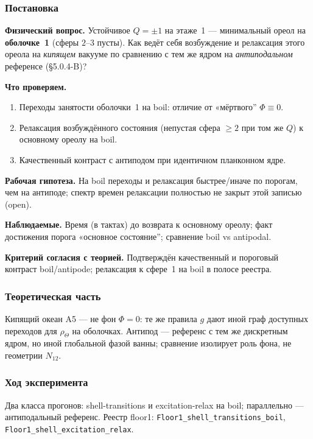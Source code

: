 \label{exp:cef03}

\subsubsection*{Постановка}
\textbf{Физический вопрос.}
Устойчивое $Q=\pm1$ на этаже~1 --- минимальный ореол на \textbf{оболочке~1} (сферы $2$--$3$ пусты).
Как ведёт себя возбуждение и релаксация этого ореола на \emph{кипящем} вакууме по сравнению с тем же ядром на \emph{антиподальном} референсе (§5.0.4-B)?

\textbf{Что проверяем.}
\begin{enumerate}[label=\textbf{(\alph*)},leftmargin=*,itemsep=0.25em]
\item Переходы занятости оболочки~1 на boil: отличие от «мёртвого'' $\Phi\equiv0$.
\item Релаксация возбуждённого состояния (непустая сфера $\ge2$ при том же $Q$) к основному ореолу на boil.
\item Качественный контраст с антиподом при идентичном планконном ядре.
\end{enumerate}

\textbf{Рабочая гипотеза.}
На boil переходы и релаксация быстрее/иначе по порогам, чем на антиподе; спектр времен релаксации полностью не закрыт этой записью (open).

\textbf{Наблюдаемые.}
Время (в тактах) до возврата к основному ореолу; факт достижения порога «основное состояние''; сравнение boil vs antipodal.

\textbf{Критерий согласия с теорией.}
Подтверждён качественный и пороговый контраст boil/antipode; релаксация к сфере~1 на boil в полосе реестра.

\subsubsection*{Теоретическая часть}
Кипящий океан A5 --- не фон $\Phi=0$: те же правила $g$ дают иной граф доступных переходов для $\rho_\Theta$ на оболочках.
Антипод --- референс с тем же дискретным ядром, но иной глобальной фазой ванны; сравнение изолирует роль фона, не геометрии $N_{12}$.

\subsubsection*{Ход эксперимента}
Два класса прогонов: shell-transitions и excitation-relax на boil; параллельно --- антиподальный референс.
Реестр floor1: \texttt{Floor1\_shell\_transitions\_boil}, \texttt{Floor1\_shell\_excitation\_relax}.

